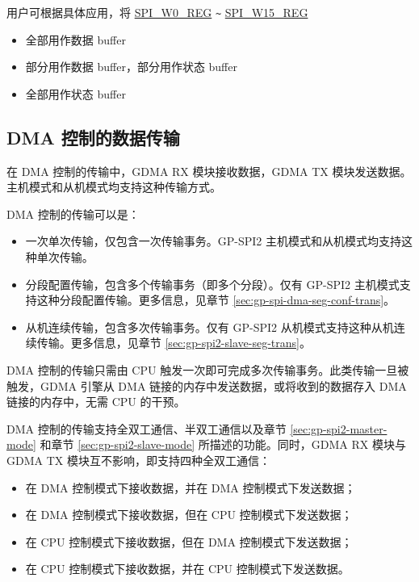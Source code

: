 \documentclass[main\_\_CN.tex]{subfiles}
\begin{document}
用户可根据具体应用，将 \hyperref[regdesc:SPIW0REG]{SPI\_W0\_REG} \verb+~+ \hyperref[regdesc:SPIW15REG]{SPI\_W15\_REG}
\begin{itemize}
    \item 全部用作数据 buffer
    \item 部分用作数据 buffer，部分用作状态 buffer
    \item 全部用作状态 buffer
\end{itemize}



\subsection{DMA 控制的数据传输}\label{sec:usage-of-gp-spi2-dma-controlled-mode}

在 DMA 控制的传输中，GDMA RX 模块接收数据，GDMA TX 模块发送数据。主机模式和从机模式均支持这种传输方式。

DMA 控制的传输可以是：

\begin{itemize}
    \item 一次单次传输，仅包含一次传输事务。GP-SPI2 主机模式和从机模式均支持这种单次传输。
    \item 分段配置传输，包含多个传输事务（即多个分段）。仅有 GP-SPI2 主机模式支持这种分段配置传输。更多信息，见章节  \ref{sec:gp-spi-dma-seg-conf-trans}。
    \item 从机连续传输，包含多次传输事务。仅有 GP-SPI2 从机模式支持这种从机连续传输。更多信息，见章节  \ref{sec:gp-spi2-slave-seg-trans}。
\end{itemize}

DMA 控制的传输只需由 CPU 触发一次即可完成多次传输事务。此类传输一旦被触发，GDMA 引擎从 DMA 链接的内存中发送数据，或将收到的数据存入 DMA 链接的内存中，无需 CPU 的干预。

DMA 控制的传输支持全双工通信、半双工通信以及章节 \ref{sec:gp-spi2-master-mode} 和章节 \ref{sec:gp-spi2-slave-mode} 所描述的功能。同时，GDMA RX 模块与 GDMA TX 模块互不影响，即支持四种全双工通信：

\begin{itemize}
    \item 在 DMA 控制模式下接收数据，并在 DMA 控制模式下发送数据；

    \item 在 DMA 控制模式下接收数据，但在 CPU 控制模式下发送数据；

    \item 在 CPU 控制模式下接收数据，但在 DMA 控制模式下发送数据；

    \item 在 CPU 控制模式下接收数据，并在 CPU 控制模式下发送数据。

\end{itemize}
\end{document}
